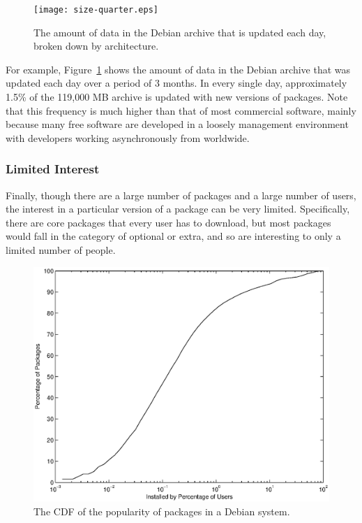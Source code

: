 \documentclass[conference]{IEEEtran}
\begin{document}
\begin{figure}
\centering
\texttt{[image: size-quarter.eps]}
\caption{The amount of data in the Debian archive that is updated
each day, broken down by architecture.}
\label{update_size}
\end{figure}

For example, Figure~\ref{update_size} shows the amount of data in
the Debian archive that was updated each day over a period of 3
months. In every single day, approximately 1.5\% of the 119,000 MB archive is
updated with new versions of packages. Note that this frequency is much higher than
that of most commercial software, mainly because many free software are
developed in a loosely management environment with developers working
asynchronously from worldwide. 

\subsubsection{Limited Interest}

Finally, though there are a large number of packages and a large number of
users, the interest in a particular version of a package can be very 
limited. Specifically, there are core packages that every user has to download, but most
packages would fall in the category of optional or extra, and so are
interesting to only a limited number of people.

\begin{figure}
\centering
\includegraphics[width=\columnwidth]{apt_p2p_popularity-cdf.eps}
\caption{The CDF of the popularity of packages in a Debian system.}
\label{popularity_CDF}
\end{figure}
\end{document}
